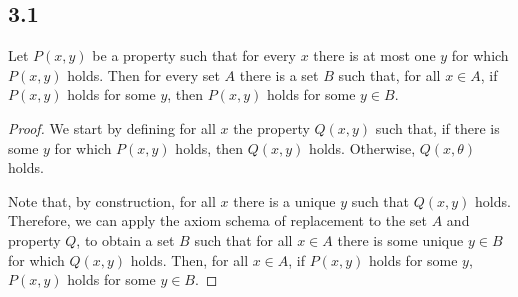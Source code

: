 \subsection*{3.1} Let $P(x,y)$ be a property such that for every $x$ there is at most one $y$ for which $P(x,y)$ holds. Then for every set $A$ there is a set $B$ such that, for all $x \in A$, if $P(x,y)$ holds for some $y$, then $P(x,y)$ holds for some $y\in B$.

\begin{proof}
    We start by defining for all $x$ the property $Q(x,y)$ such that, if there is some $y$ for which $P(x,y)$ holds, then $Q(x,y)$ holds. Otherwise, $Q(x,\theta)$ holds.

    Note that, by construction, for all $x$ there is a unique $y$ such that $Q(x,y)$ holds. Therefore, we can apply the axiom schema of replacement to the set $A$ and property $Q$, to obtain a set $B$ such that for all $x \in A$ there is some unique $y \in B$ for which $Q(x,y)$ holds. Then, for all $x \in A$, if $P(x,y)$ holds for some $y$, $P(x,y)$ holds for some $y\in B$.
\end{proof}


